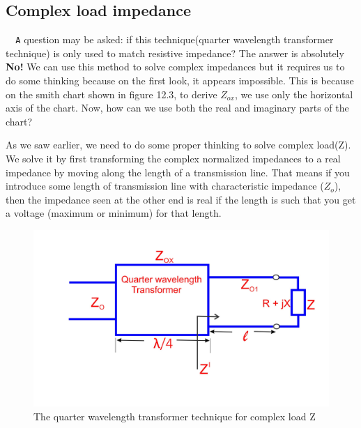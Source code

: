 \subsection{Complex load impedance}
\verb| 	A| question may be asked: if this technique(quarter wavelength transformer technique) is only used to match resistive impedance? The answer is absolutely \textbf{No!}  We can use this method to solve complex impedances but it requires us to do some thinking because on the first look, it appears impossible. This is because on the smith chart shown in figure 12.3, to derive $Z_{ox}$, we use only the horizontal axis of the chart. Now, how can we use both the real and imaginary parts of the chart?

As we saw earlier, we need to do some proper thinking to solve complex load(Z). We solve it  by first transforming the complex  normalized impedances to a real impedance by moving along the length of a transmission line. That means if you introduce some length of transmission line with characteristic impedance ($ Z_o$), then the impedance seen at the other end is real if the length is such that you get a voltage (maximum or minimum) for that length.
\begin{figure}[h]
\centering
\includegraphics[width=1\linewidth]{./graphics/fig10}
\caption{The quarter wavelength transformer technique for complex load Z}
\end{figure}

